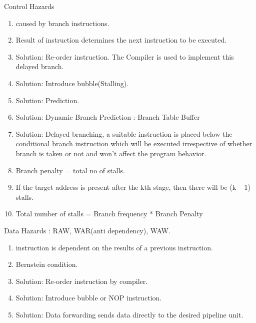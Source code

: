 \begin{enumerate}
    \item Control Hazards
    \begin{enumerate}
        \item caused by branch instructions.
        \item Result of instruction determines the next instruction to be executed.
        \item Solution: Re-order instruction. The Compiler is used to implement this delayed branch.
        \item Solution: Introduce bubble(Stalling).
        \item Solution: Prediction.
        \item Solution: Dynamic Branch Prediction : Branch Table Buffer
        \item Solution: Delayed branching, a suitable instruction is placed below the conditional
              branch instruction which will be executed irrespective of whether branch is taken or
              not and won’t affect the program behavior.
        \item Branch penalty = total no of stalls.
        \item If the target address is present after the kth stage, then there will be (k – 1) stalls.
        \item Total number of stalls = Branch frequency * Branch Penalty
    \end{enumerate}

    \begin{minipage}{\linewidth}
    \item Data Hazards : RAW, WAR(anti dependency), WAW.
    \begin{enumerate}
        \item instruction is dependent on the results of a previous instruction.
        \item Bernstein condition.
        \item Solution: Re-order instruction by compiler.
        \item Solution: Introduce bubble or NOP instruction.
        \item Solution: Data forwarding sends data directly to the desired pipeline unit.
    \end{enumerate}

    \newpage


\end{minipage}
\end{enumerate}

